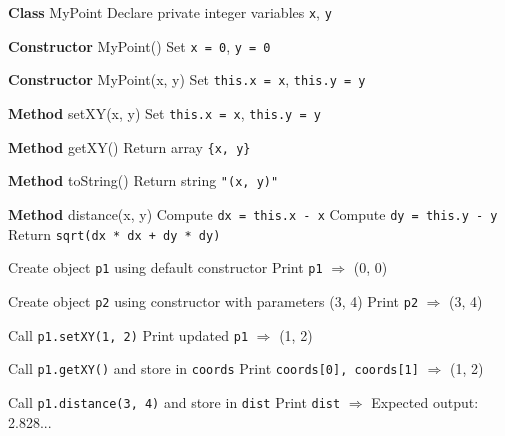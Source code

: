 \begin{algorithm}[H]
\caption{Class \texttt{MyPoint} Functionality}
\begin{algorithmic}[1]
\STATE \textbf{Class} MyPoint
\STATE Declare private integer variables \texttt{x}, \texttt{y}

\STATE \textbf{Constructor} MyPoint()
\STATE \quad Set \texttt{x = 0}, \texttt{y = 0}

\STATE \textbf{Constructor} MyPoint(x, y)
\STATE \quad Set \texttt{this.x = x}, \texttt{this.y = y}

\STATE \textbf{Method} setXY(x, y)
\STATE \quad Set \texttt{this.x = x}, \texttt{this.y = y}

\STATE \textbf{Method} getXY()
\STATE \quad Return array \texttt{\{x, y\}}

\STATE \textbf{Method} toString()
\STATE \quad Return string \texttt{"(x, y)"}

\STATE \textbf{Method} distance(x, y)
\STATE \quad Compute \texttt{dx = this.x - x}
\STATE \quad Compute \texttt{dy = this.y - y}
\STATE \quad Return \texttt{sqrt(dx * dx + dy * dy)}
\end{algorithmic}
\end{algorithm}

\begin{algorithm}[H]
\caption{Testing Class \texttt{MyPoint} in \texttt{TestMyPoint}}
\begin{algorithmic}[1]
\STATE Create object \texttt{p1} using default constructor
\STATE Print \texttt{p1} $\Rightarrow$ (0, 0)

\STATE Create object \texttt{p2} using constructor with parameters (3, 4)
\STATE Print \texttt{p2} $\Rightarrow$ (3, 4)

\STATE Call \texttt{p1.setXY(1, 2)}
\STATE Print updated \texttt{p1} $\Rightarrow$ (1, 2)

\STATE Call \texttt{p1.getXY()} and store in \texttt{coords}
\STATE Print \texttt{coords[0], coords[1]} $\Rightarrow$ (1, 2)

\STATE Call \texttt{p1.distance(3, 4)} and store in \texttt{dist}
\STATE Print \texttt{dist} $\Rightarrow$ Expected output: 2.828...
\end{algorithmic}
\end{algorithm}
